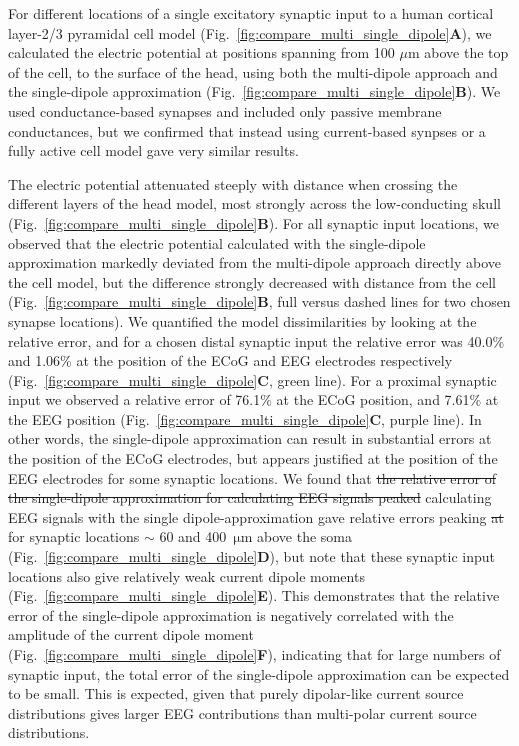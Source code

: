 \documentclass[preprint,10pt,authoryear]{elsarticle}
\newcommand{\sntxt}[1]{{\color{NavyBlue}#1}}
\begin{document}
For different locations of a single excitatory synaptic input to a human cortical layer-2/3 pyramidal cell model \citep{EYAL2016}
(Fig.~\ref{fig:compare_multi_single_dipole}\textbf{A}), we calculated the electric potential at positions spanning from 100 $\mu$m above the top of the cell, to the surface of the head, using both the multi-dipole approach and the single-dipole approximation (Fig.~\ref{fig:compare_multi_single_dipole}\textbf{B}).
We used conductance-based synapses and included only passive membrane conductances, but we confirmed that instead using current-based synpses or a fully active cell model gave very similar results.  

The electric potential attenuated steeply with distance when crossing the different layers of the head model, most strongly across the low-conducting skull (Fig.~\ref{fig:compare_multi_single_dipole}\textbf{B}). 
For all synaptic input locations, we observed that the electric potential calculated with the single-dipole approximation markedly deviated from the multi-dipole approach directly above the cell model, but the difference strongly decreased with distance from the cell (Fig.~\ref{fig:compare_multi_single_dipole}\textbf{B}, full versus dashed lines for two chosen synapse locations). 
We quantified the model dissimilarities by looking at the relative error, and for a chosen distal synaptic input the relative error was 40.0\% and 1.06\% at the position of the ECoG and EEG electrodes respectively (Fig.~\ref{fig:compare_multi_single_dipole}\textbf{C}, green line). For a proximal synaptic input we observed a relative error of 76.1$\%$ at the ECoG position, and 7.61$\%$ at the EEG position (Fig.~\ref{fig:compare_multi_single_dipole}\textbf{C}, purple line).
In other words, the single-dipole approximation can result in substantial errors at the position of the ECoG electrodes, but appears justified at the position of the EEG electrodes for some synaptic locations. We found that \sntxt{\sout{the relative error of the single-dipole approximation for calculating EEG signals peaked} calculating EEG signals with the single dipole-approximation gave relative errors} peaking \sntxt{\sout{at} for} synaptic locations $\sim$ 60 and 400~$\si{\um}$
above the soma (Fig.~\ref{fig:compare_multi_single_dipole}\textbf{D}),
but note that these synaptic input locations also give relatively weak current dipole moments (Fig.~\ref{fig:compare_multi_single_dipole}\textbf{E}).
This demonstrates that the relative error of the single-dipole approximation is negatively correlated with the amplitude of the current dipole moment (Fig.~\ref{fig:compare_multi_single_dipole}\textbf{F}), indicating that for large numbers of synaptic input, the total error of the single-dipole approximation can be expected to be small. This is expected, given that purely dipolar-like current source distributions gives larger EEG contributions than multi-polar current source distributions.
\end{document}
